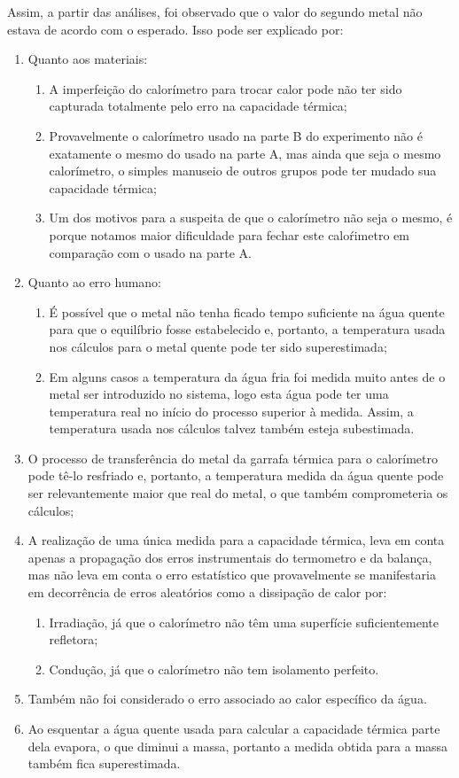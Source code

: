 \documentclass[a4paper]{article}
\begin{document}
		Assim, a partir das análises, foi observado que o valor do segundo metal não estava de acordo com o esperado. Isso pode ser explicado por: 
		\begin{enumerate}
			\item Quanto aos materiais: 
				\begin{enumerate}
					\item A imperfeição do calorímetro para trocar calor pode não ter sido capturada
					totalmente pelo erro na capacidade térmica; 
					\item Provavelmente o calorímetro usado na parte B do experimento não é
					exatamente o mesmo do usado na parte A, mas ainda que seja o mesmo
					calorímetro, o simples manuseio de outros grupos pode ter mudado sua
					capacidade térmica; 
					\item Um dos motivos para a suspeita de que o calorímetro não seja o mesmo,
					é porque notamos maior dificuldade para fechar este calo\'{r}imetro
					em comparação com o usado na parte A. 
				\end{enumerate}
			\item Quanto ao erro humano: 
				\begin{enumerate}
					\item É possível que o metal não tenha ficado tempo suficiente na água quente
					para que o equilíbrio fosse estabelecido e, portanto, a temperatura
					usada nos cálculos para o metal quente pode ter sido superestimada; 
					\item Em alguns casos a temperatura da água fria foi medida muito antes
					de o metal ser introduzido no sistema, logo esta água pode ter uma
					temperatura real no início do processo superior à medida. Assim, a
					temperatura usada nos cálculos talvez também esteja subestimada. 
				\end{enumerate}
			\item O processo de transferência do metal da garrafa térmica para o calorímetro
			pode tê-lo resfriado e, portanto, a temperatura medida da água quente
			pode ser relevantemente maior que real do metal, o que também comprometeria
			os cálculos; 
			\item A realização de uma única medida para a capacidade térmica, leva em
			conta apenas a propagação dos erros instrumentais do termometro e
			da balança, mas não leva em conta o erro estatístico que provavelmente
			se manifestaria em decorrência de erros aleatórios como a dissipação
			de calor por: 
				\begin{enumerate}
					\item Irradiação, já que o calorímetro não têm uma superfície suficientemente
					refletora; 
					\item Condução, já que o calorímetro não tem isolamento perfeito. 
				\end{enumerate}
			\item Também não foi considerado o erro associado ao calor específico da
			água. 
			\item Ao esquentar a água quente usada para calcular a capacidade térmica
			parte dela evapora, o que diminui a massa, portanto a medida obtida
			para a massa também fica superestimada. 
		\end{enumerate}
\end{document}
